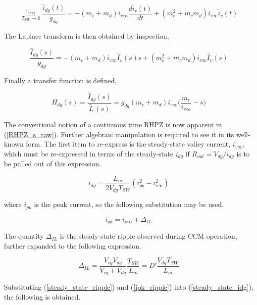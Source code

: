 \documentclass[conference]{IEEEtran}
\begin{document}
\begin{equation}
\lim_{T_{SW} \to 0} \frac{\hat{i}_{dg}(t)}{g_{dg}} = -(m_c + m_d) i_{v\infty} \frac{d \hat{i}_v(t)}{dt}
+ 	( m_c^2 + m_c m_d ) i_{v\infty} \hat{i}_v(t) 
\end{equation}

The Laplace transform is then obtained by inspection,

\begin{equation}
	 \frac{\hat{I}_{dg}(s)}{g_{dg}} =  - (m_c + m_d) i_{v\infty}\hat{I}_{v}(s)s + ( m_c^2 + m_c m_d ) i_{v\infty} \hat{I}_{v}(s)
\end{equation}

Finally a transfer function is defined,

\begin{equation}
H_{dg} (s) = \frac{\hat{I}_{dg}(s)}{\hat{I}_{v}(s)} =  g_{dg} (m_c + m_d) i_{v\infty}
\big (\frac{m_c}{i_{v\infty}} - s \big )
\label{RHPZ_s_raw}
\end{equation}

The conventional notion of a continuous time RHPZ is now apparent in (\ref{RHPZ_s_raw}).  
Further algebraic manipulation is required to see it in its well-known form.  The first item to re-express is the steady-state valley current, $i_{v\infty}$, which must be re-expressed in terms of the steady-state $i_{dg}$ if $R_{out} = V_{dg}/i_{dg}$ is to be pulled out of this expression.

\begin{equation}
	i_{dg} = \frac{L_m}{2V_{dg}T_{SW}} (i_{pk}^2 - i_{v\infty}^2)
	\label{steady_state_idg}
\end{equation}

where $i_{pk}$ is the peak current, so the following substitution may be used.

\begin{equation}
i_{pk} = i_{v\infty} + \Delta_{IL}
\label{ipk_ripple}
\end{equation}

The quantity $\Delta_{IL}$ is the steady-state ripple observed during CCM operation, further expanded to the following expression.

\begin{equation}
\Delta_{IL} = \frac{V_{cg}V_{dg}}{V_{cg} + V_{dg}} \frac{T_{SW}}{L_m} =
D'\frac{V_{dg} T_{SW}}{L_m}
\label{steady_state_ripple}
\end{equation}

Substituting (\ref{steady_state_ripple}) and (\ref{ipk_ripple}) into (\ref{steady_state_idg}), the following is obtained.
\end{document}
